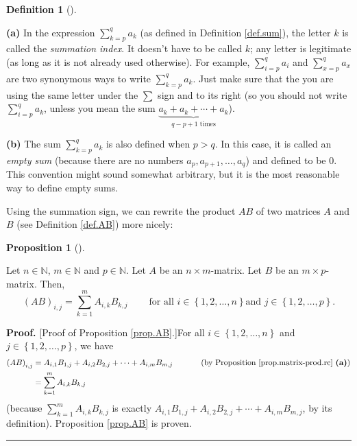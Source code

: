 \documentclass[numbers=enddot,12pt,final,onecolumn,notitlepage]{scrartcl}%
\theoremstyle{definition}
\newtheorem{prop}[theo]{Proposition}
\newenvironment{proposition}[1][]
{\begin{prop}[#1]\begin{leftbar}}
{\end{leftbar}\end{prop}}
\newtheorem{defi}[theo]{Definition}
\newenvironment{definition}[1][]
{\begin{defi}[#1]\begin{leftbar}}
{\end{leftbar}\end{defi}}
\newenvironment{proof}[1][Proof]{\noindent\textbf{#1.} }{\ \rule{0.5em}{0.5em}}
\let\sumnonlimits\sum
\renewcommand{\sum}{\sumnonlimits\limits}
\begin{document}
\begin{definition}
\label{def.sum.2}\textbf{(a)} In the expression $\sum_{k=p}^{q}a_{k}$ (as
defined in Definition \ref{def.sum}), the letter $k$ is called the
\textit{summation index}. It doesn't have to be called $k$; any letter is
legitimate (as long as it is not already used otherwise). For example,
$\sum_{i=p}^{q}a_{i}$ and $\sum_{x=p}^{q}a_{x}$ are two synonymous ways to
write $\sum_{k=p}^{q}a_{k}$. Just make sure that the you are using the same
letter under the $\sum$ sign and to its right (so you should not write
$\sum_{i=p}^{q}a_{k}$, unless you mean the sum $\underbrace{a_{k}+a_{k}%
+\cdots+a_{k}}_{q-p+1\text{ times}}$).

\textbf{(b)} The sum $\sum_{k=p}^{q}a_{k}$ is also defined when $p>q$. In this
case, it is called an \textit{empty sum} (because there are no numbers
$a_{p},a_{p+1},\ldots,a_{q}$) and defined to be $0$. This convention might
sound somewhat arbitrary, but it is the most reasonable way to define empty sums.
\end{definition}

Using the summation sign, we can rewrite the product $AB$ of two matrices $A$
and $B$ (see Definition \ref{def.AB}) more nicely:

\begin{proposition}
\label{prop.AB}Let $n\in\mathbb{N}$, $m\in\mathbb{N}$ and $p\in\mathbb{N}$.
Let $A$ be an $n\times m$-matrix. Let $B$ be an $m\times p$-matrix. Then,%
\[
\left(  AB\right)  _{i,j}=\sum_{k=1}^{m}A_{i,k}B_{k,j}%
\ \ \ \ \ \ \ \ \ \ \text{for all }i\in\left\{  1,2,\ldots,n\right\}  \text{
and }j\in\left\{  1,2,\ldots,p\right\}  .
\]

\end{proposition}

\begin{proof}
[Proof of Proposition \ref{prop.AB}.]For all $i\in\left\{  1,2,\ldots
,n\right\}  $ and $j\in\left\{  1,2,\ldots,p\right\}  $, we have%
\begin{align*}
\left(  AB\right)  _{i,j}  &  =A_{i,1}B_{1,j}+A_{i,2}B_{2,j}+\cdots
+A_{i,m}B_{m,j}\ \ \ \ \ \ \ \ \ \ \left(  \text{by Proposition
\ref{prop.matrix-prod.rc} \textbf{(a)}}\right) \\
&  =\sum_{k=1}^{m}A_{i,k}B_{k,j}%
\end{align*}
(because $\sum_{k=1}^{m}A_{i,k}B_{k,j}$ is exactly $A_{i,1}B_{1,j}%
+A_{i,2}B_{2,j}+\cdots+A_{i,m}B_{m,j}$, by its definition). Proposition
\ref{prop.AB} is proven.
\end{proof}
\end{document}
